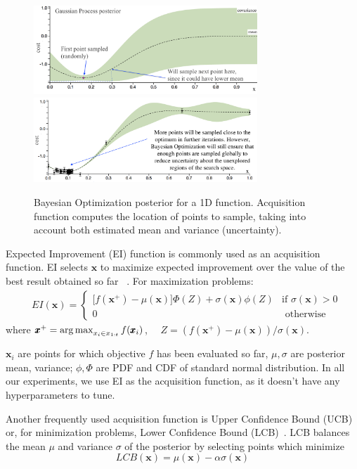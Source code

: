 \begin{figure}[t]
\centering
\includegraphics[width=0.75\textwidth]{img/bo_first_point.png}
\vspace{4px}
\includegraphics[width=0.75\textwidth]{img/bo_later_points.png}
\caption{\small{Bayesian Optimization posterior for a 1D function. Acquisition function computes the location of points to sample, taking into account both estimated mean and variance (uncertainty).}}
\label{fig_bo_illustration}
\end{figure}

Expected Improvement (EI) function is commonly used as an acquisition function. EI selects $\pmb{x}$ to maximize expected improvement over the value of the best result obtained so far ~\citep{mockus1978ei}. For maximization problems:
\begin{align}
&EI(\pmb{x}) =
\begin{cases}
\big[f(\pmb{x}^+) \!-\! \mu(\pmb{x})\big] \Phi(Z) + \sigma(\pmb{x}) \phi(Z) & \text{if } \sigma(\pmb{x})\!>\!0 \\
0 & \text{ otherwise}
\end{cases} 
\end{align}
where $ \pmb{x}^+ = \operatorname*{arg\,max}_{x_i \in x_{1:t}} f(\pmb{x}_i) $, $\quad Z = (f(\pmb{x}^+) \!-\! \mu(\pmb{x})) / \sigma(\pmb{x})$. 

$\pmb{x}_i$ are points for which objective $f$ has been evaluated so far, $\mu,\sigma$ are posterior mean, variance; $\phi, \Phi$ are PDF and CDF of standard normal distribution. In all our experiments, we use EI as the acquisition function, as it doesn't have any hyperparameters to tune.

Another frequently used acquisition function is Upper Confidence Bound (UCB) or, for minimization problems, Lower Confidence Bound (LCB)~\citep{srinivas2009gpucb}. LCB balances the mean $\mu$ and variance $\sigma$ of the posterior by selecting points which minimize 
\begin{equation}
\label{eq:lcb}
    LCB(\pmb{x}) = \mu(\pmb{x}) - \alpha \sigma(\pmb{x})
\end{equation}

